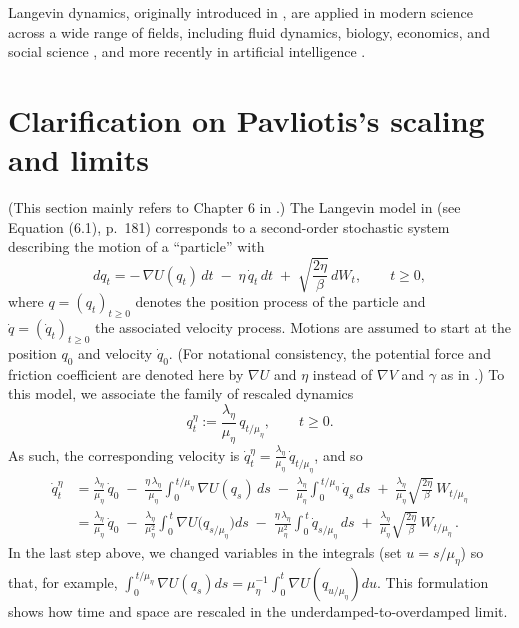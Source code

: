 \documentclass[12pt]{article}
\numberwithin{equation}{section}
\theoremstyle{remark}
\begin{document}
Langevin dynamics, originally introduced in \cite{l08}, are applied in modern science across a wide range of fields, including fluid dynamics, biology, economics, and social science \cite{npt10,pt13}, and more recently in artificial intelligence \cite{ccb18}.

\section{Clarification on Pavliotis's scaling and limits}

(This section mainly refers to Chapter 6 in \cite{p14}.) The Langevin model in \cite{p14} (see Equation (6.1), p. 181) corresponds to a second-order stochastic system describing the motion of a “particle” with 
\[ 
dq_t = -\,\nabla U(q_t)\,dt \;-\; \eta\,\dot{q}_t\,dt \;+\; \sqrt{\frac{2\eta}{\beta}}\,dW_t, \qquad t \ge 0, 
\] 
where $q = (q_t)_{t\ge0}$ denotes the position process of the particle and $\dot{q} = (\dot{q}_t)_{t\ge0}$ the associated velocity process. Motions are assumed to start at the position $q_0$ and velocity $\dot{q}_0$. (For notational consistency, the potential force and friction coefficient are denoted here by $\nabla U$ and $\eta$ instead of $\nabla V$ and $\gamma$ as in \cite{p14}.) To this model, we associate the family of rescaled dynamics 
\[ 
q_t^\eta := \frac{\lambda_\eta}{\mu_\eta}\,q_{t/\mu_\eta}, \qquad t \ge 0. 
\] 
As such, the corresponding velocity is $\dot{q}_t^\eta = \frac{\lambda_\eta}{\mu_\eta}\,\dot{q}_{t/\mu_\eta}$, and so 
\begin{align*}
\dot{q}_t^\eta &= \frac{\lambda_\eta}{\mu_\eta}\,\dot{q}_0 \;-\; \frac{\eta\,\lambda_\eta}{\mu_\eta}\int_{0}^{\,t/\mu_\eta} \nabla U(q_s)\,ds \;-\; \frac{\lambda_\eta}{\mu_\eta}\int_{0}^{\,t/\mu_\eta} \dot{q}_s\,ds \;+\; \frac{\lambda_\eta}{\mu_\eta}\sqrt{\frac{2\eta}{\beta}}\,W_{t/\mu_\eta} \\[6pt]
&= \frac{\lambda_\eta}{\mu_\eta}\,\dot{q}_0 \;-\; \frac{\lambda_\eta}{\mu_\eta^2}\int_{0}^{\,t} \nabla U\!\big(q_{s/\mu_\eta}\big)ds \;-\; \frac{\eta\,\lambda_\eta}{\mu_\eta^2}\int_{0}^{\,t} \dot{q}_{s/\mu_\eta}\,ds \;+\; \frac{\lambda_\eta}{\mu_\eta}\sqrt{\frac{2\eta}{\beta}}\,W_{t/\mu_\eta}\,. 
\end{align*}
In the last step above, we changed variables in the integrals (set $u = s/\mu_\eta$) so that, for example, $\int_0^{\,t/\mu_\eta}\nabla U(q_s)ds = \mu_\eta^{-1}\int_0^t \nabla U(q_{u/\mu_\eta})du$. This formulation shows how time and space are rescaled in the underdamped-to-overdamped limit.
\end{document}
